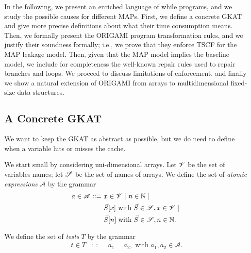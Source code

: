 In the following, we present an enriched language of while programs, and we study the possible causes for different MAPs. First, we define a concrete GKAT and give more precise definitions about what their time consumption means. Then, we formally present the ORIGAMI program transformation rules, and we justify their soundness formally; i.e., we prove that they enforce TSCF for the MAP leakage model. Then, given that the MAP model implies the baseline model, we include for completeness the well-known repair rules used to repair branches and loops. We proceed to discuss limitations of enforcement, and finally we show a natural extension of ORIGAMI from arrays to multidimensional fixed-size data structures.

\subsection{A Concrete GKAT}
\label{sec:SideChannels:ConcreteGKAT}
We want to keep the GKAT as abstract as possible, but we do need to define when a variable hits or misses the cache. 

We start small by considering uni-dimensional arrays. Let $\mathscr{V}$ be the set of variables names; let $\mathscr{S}$ be the set of names of arrays. We define the set of \emph{atomic expressions} $\mathscr{A}$ by the grammar
{\small{\begin{align*}      
a\in \mathscr{A}::=
\ &x\in \Variables\ |\ %
 n \in \mathbb{N}
 \ |\ \\
 &\vec{S}[x]\text{ with $\vec{S}\in \Structures, x\in \Variables$}
 \ |\ \\
 &\vec{S}[n]\text{ with $\vec{S}\in \Structures, n\in \mathbb{N}$}.
\end{align*}}}

We define the set of \emph{tests} $T$ by the grammar 
{\small{\begin{align*}
    t\in T&::=\ \   a_1=a_2, \text{ with $a_1,a_2\in \mathscr{A}$.}
    \end{align*}}}

